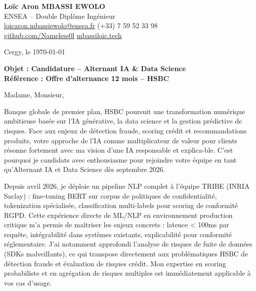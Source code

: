 \documentclass[a4paper,11pt]{article}
\begin{document}
\noindent
\textbf{Lo\"ic Aron MBASSI EWOLO} \\
ENSEA -- Double Dipl\^ome Ing\'enieur \\
\href{mailto:loicaron.mbassiewolo@ensea.fr}{loicaron.mbassiewolo@ensea.fr} \quad (+33) 7 59 52 33 98 \\
\href{https://github.com/Nameless0l}{github.com/Nameless0l} \quad \href{https://mbassiloic.tech}{mbassiloic.tech}

\vspace{1em}
\noindent
Cergy, le \today

\vspace{1em}
\noindent
\textbf{Objet : Candidature -- Alternant IA \& Data Science} \\
\textbf{R\'ef\'erence : Offre d'alternance 12 mois -- HSBC}

\vspace{1.5em}
\noindent Madame, Monsieur,

\vspace{0.8em}
\noindent Banque globale de premier plan, HSBC poursuit une transformation numérique ambitieuse basée sur l'IA générative, la data science et la gestion prédictive de risques. Face aux enjeux de détection fraude, scoring crédit et recommandations produits, votre approche de l'IA comme multiplicateur de valeur pour clients résonne fortement avec ma vision d'une IA responsable et explica-ble. C'est pourquoi je candidats avec enthousiasme pour rejoindre votre équipe en tant qu'Alternant IA et Data Science dès septembre 2026.

\vspace{0.8em}
\noindent Depuis avril 2026, je déploie un pipeline NLP complet à l'équipe TRIBE (INRIA Saclay) : fine-tuning BERT sur corpus de politiques de confidentialité, tokenization spécialisée, classification multi-labels pour scoring de conformité RGPD. Cette expérience directe de ML/NLP en environnement production critique m'a permis de maîtriser les enjeux concrets : latence < 100ms par requête, intégrabilité dans systèmes existants, explicabilité pour conformité réglementaire. J'ai notamment approfondi l'analyse de risques de fuite de données (SDKs malveillants), ce qui transpose directement aux problématiques HSBC de détection fraude et évaluation de risques crédit. Mon expertise en scoring probabiliste et en agrégation de risques multiples est immédiatement applicable à vos cas d'usage.
\end{document}
